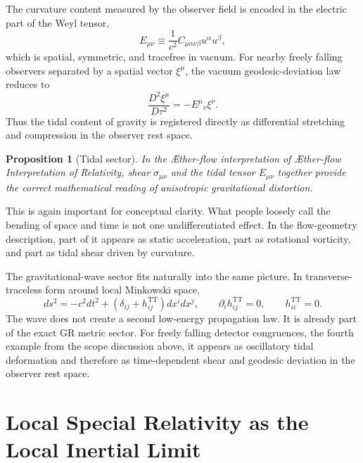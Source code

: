 \documentclass[11pt]{article}
\newcommand{\Aflow}{\AE{}ther-flow}
\newcommand{\TheoryName}{\Aflow{} Interpretation of Relativity}
\newtheorem{proposition}{Proposition}
\begin{document}
The curvature content measured by the observer field is encoded in the electric part of the Weyl tensor,
\begin{equation}
E_{\mu\nu}
\equiv
\frac{1}{c^2}C_{\mu\alpha\nu\beta}u^\alpha u^\beta,
\label{eq:weylelectric}
\end{equation}
which is spatial, symmetric, and tracefree in vacuum. For nearby freely falling observers separated by a spatial vector \(\xi^\mu\), the vacuum geodesic-deviation law reduces to
\begin{equation}
\frac{D^2 \xi^\mu}{D\tau^2}
=
-E^\mu{}_{\nu}\xi^\nu.
\label{eq:geodesicdeviation}
\end{equation}
Thus the tidal content of gravity is registered directly as differential stretching and compression in the observer rest space.

\begin{proposition}[Tidal sector]
In the \Aflow{} interpretation of \TheoryName{}, shear \(\sigma_{\mu\nu}\) and the tidal tensor \(E_{\mu\nu}\) together provide the correct mathematical reading of anisotropic gravitational distortion.
\end{proposition}

This is again important for conceptual clarity. What people loosely call the bending of space and time is not one undifferentiated effect. In the flow-geometry description, part of it appears as static acceleration, part as rotational vorticity, and part as tidal shear driven by curvature.

The gravitational-wave sector fits naturally into the same picture. In transverse-traceless form around local Minkowski space,
\begin{equation}
ds^2
=
-c^2dt^2
+
\left(\delta_{ij}+h^{\mathrm{TT}}_{ij}\right)dx^i dx^j,
\qquad
\partial_i h^{\mathrm{TT}}_{ij}=0,
\qquad
h^{\mathrm{TT}}_{ii}=0.
\label{eq:ttmetric}
\end{equation}
The wave does not create a second low-energy propagation law. It is already part of the exact GR metric sector. For freely falling detector congruences, the fourth example from the scope discussion above, it appears as oscillatory tidal deformation and therefore as time-dependent shear and geodesic deviation in the observer rest space.

\section{Local Special Relativity as the Local Inertial Limit}
\end{document}
